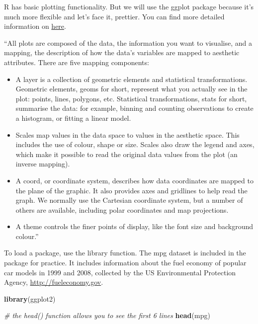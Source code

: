 \documentclass[
]{article}
\newenvironment{Shaded}{\begin{snugshade}}{\end{snugshade}}
\newcommand{\CommentTok}[1]{\textcolor[rgb]{0.56,0.35,0.01}{\textit{#1}}}
\newcommand{\FunctionTok}[1]{\textcolor[rgb]{0.13,0.29,0.53}{\textbf{#1}}}
\newcommand{\NormalTok}[1]{#1}
\begin{document}
R has basic plotting functionality. But we will use the ggplot package
because it's much more flexible and let's face it, prettier. You can
find more detailed information on
\href{https://ggplot2-book.org/introduction.html}{here}.

``All plots are composed of the data, the information you want to
visualise, and a mapping, the description of how the data's variables
are mapped to aesthetic attributes. There are five mapping components:

\begin{itemize}
\item
  A layer is a collection of geometric elements and statistical
  transformations. Geometric elements, geoms for short, represent what
  you actually see in the plot: points, lines, polygons, etc.
  Statistical transformations, stats for short, summarise the data: for
  example, binning and counting observations to create a histogram, or
  fitting a linear model.
\item
  Scales map values in the data space to values in the aesthetic space.
  This includes the use of colour, shape or size. Scales also draw the
  legend and axes, which make it possible to read the original data
  values from the plot (an inverse mapping).
\item
  A coord, or coordinate system, describes how data coordinates are
  mapped to the plane of the graphic. It also provides axes and
  gridlines to help read the graph. We normally use the Cartesian
  coordinate system, but a number of others are available, including
  polar coordinates and map projections.
\item
  A theme controls the finer points of display, like the font size and
  background colour.''
\end{itemize}

To load a package, use the library function. The mpg dataset is included
in the package for practice. It includes information about the fuel
economy of popular car models in 1999 and 2008, collected by the US
Environmental Protection Agency, \url{http://fueleconomy.gov}.

\begin{Shaded}
\begin{Highlighting}[]
\FunctionTok{library}\NormalTok{(ggplot2)}

\CommentTok{\# the head() function allows you to see the first 6 lines }
\FunctionTok{head}\NormalTok{(mpg)}
\end{Highlighting}
\end{Shaded}
\end{document}
